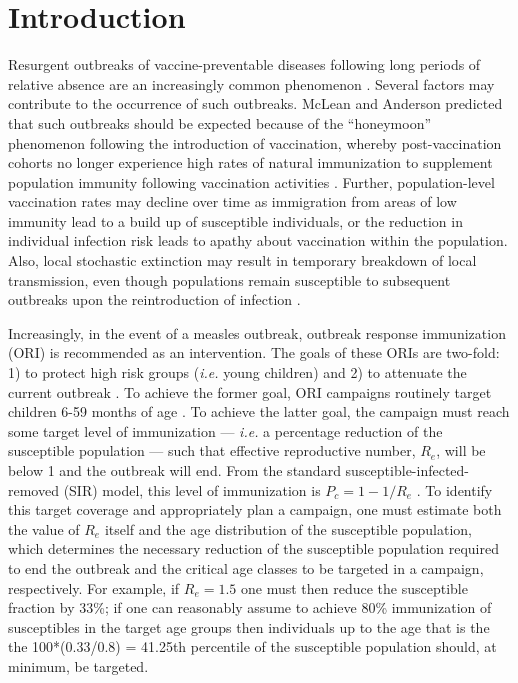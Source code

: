 \section{Introduction}\label{introduction}

Resurgent outbreaks of vaccine-preventable diseases following long periods of relative absence are an increasingly common phenomenon \cite{Hersh_1991, Cherry_2012, Celentano_2005, Shibeshi_2014}. Several factors may contribute to the occurrence of such outbreaks. McLean and Anderson \cite{McLean_1988} predicted that such outbreaks should be expected because of the ``honeymoon'' phenomenon following the introduction of vaccination, whereby post-vaccination cohorts no longer experience high rates of natural immunization to supplement population immunity following vaccination activities \cite{Jansen_2003}. Further, population-level vaccination rates may decline over time as immigration from areas of low immunity lead to a build up of susceptible individuals, or the reduction in individual infection risk \cite{Omer_2009} leads to apathy about vaccination within the population. Also, local stochastic extinction may result in temporary breakdown of local transmission, even though populations remain susceptible to subsequent outbreaks upon the reintroduction of infection \cite{Ferrari_2008}.

Increasingly, in the event of a measles outbreak, outbreak response immunization (ORI) is recommended as an intervention. The goals of these ORIs are two-fold: 1) to protect high risk groups (\emph{i.e.} young children) and 2) to attenuate the current outbreak \cite{Cairns_2011,Grais_2011} . To achieve the former goal, ORI campaigns routinely target children 6-59 months of age \cite{Cairns_2011}. To achieve the latter goal, the campaign must reach some target level of immunization --- \emph{i.e.} a percentage reduction of the susceptible population --- such that effective reproductive number, \(R_e\), will be below 1 and the outbreak will end. From the standard susceptible-infected-removed (SIR) model, this level of immunization is \(P_c = 1-1/R_e\) \cite{Anderson_1981}. To identify this target coverage and appropriately plan a campaign, one must estimate both the value of \(R_e\) itself and the age distribution of the susceptible population, which determines the necessary reduction of the susceptible population required to end the outbreak and the critical age classes to be targeted in a campaign, respectively. For example, if \(R_e=1.5\) one must then reduce the susceptible fraction by 33\%; if one can reasonably assume to achieve 80\% immunization of susceptibles in the target age groups then individuals up to the age that is the the 100*(0.33/0.8) = 41.25th percentile of the susceptible population should, at minimum, be targeted.

